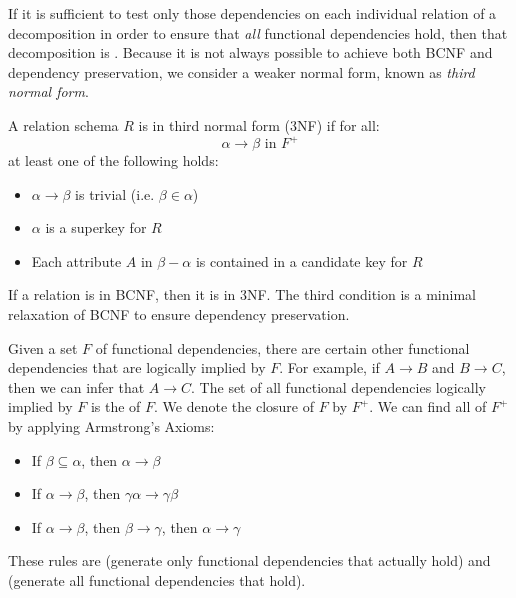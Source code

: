 \documentclass{article}
\begin{document}
If it is sufficient to test only those dependencies on each individual relation of a decomposition in order to ensure that \emph{all} functional dependencies hold, then that decomposition is . Because it is not always possible to achieve both BCNF and dependency preservation, we consider a weaker normal form, known as \emph{third normal form}. 

\begin{definition}
  A relation schema $R$ is in third normal form (3NF) if for all: $$\alpha \rightarrow \beta \textrm{ in } F^{+}$$ at least one of the following holds: 
  \begin{itemize}
    \item $\alpha \rightarrow \beta$ is trivial (i.e. $\beta \in \alpha$) 
    \item $\alpha$ is a superkey for $R$ 
    \item Each attribute $A$ in $\beta - \alpha$ is contained in a candidate key for $R$
  \end{itemize}
  If a relation is in BCNF, then it is in 3NF. The third condition is a minimal relaxation of BCNF to ensure dependency preservation. 
\end{definition}

Given a set $F$ of functional dependencies, there are certain other functional dependencies that are logically implied by $F$. For example, if $A \rightarrow B$ and $B \rightarrow C$, then we can infer that $A \rightarrow C$. The set of all functional dependencies logically implied by $F$ is the  of $F$. We denote the closure of $F$ by $F^{+}$. We can find all of $F^{+}$ by applying Armstrong's Axioms: 
\begin{itemize}
  \item If $\beta \subseteq \alpha$, then $\alpha \rightarrow \beta$ \hfill {}
  \item If $\alpha \rightarrow \beta$, then $\gamma \alpha \rightarrow \gamma \beta$ \hfill {}
  \item If $\alpha \rightarrow \beta$, then $\beta \rightarrow \gamma$, then $\alpha \rightarrow \gamma$ \hfill {}
\end{itemize}
These rules are  (generate only functional dependencies that actually hold) and  (generate all functional dependencies that hold). \\
\end{document}
